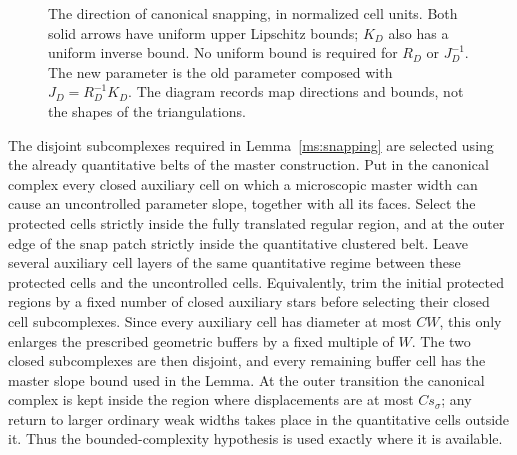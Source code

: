 \begin{figure}[htbp]
\centering
{}
\caption{The direction of canonical snapping, in normalized cell units.
Both solid arrows have uniform upper Lipschitz bounds; $K_D$ also has
a uniform inverse bound.  No uniform bound is required for
$R_D$ or $J_D^{-1}$.  The new parameter is the old parameter composed
with $J_D=R_D^{-1}K_D$.  The diagram records map directions and bounds,
not the shapes of the triangulations.}
\label{ms:fig-snapping}
\end{figure}

The disjoint subcomplexes required in
Lemma~\ref{ms:snapping} are selected using the already quantitative
belts of the master construction.  Put in the canonical complex
every closed auxiliary cell on which a microscopic master width
can cause an uncontrolled parameter slope, together with all its
faces.  Select the protected cells strictly inside the fully
translated regular region, and at the outer edge of the snap patch
strictly inside the quantitative clustered belt.  Leave several
auxiliary cell layers of the same quantitative regime between
these protected cells and the uncontrolled cells.  Equivalently,
trim the initial protected regions by a fixed number of closed
auxiliary stars before selecting their closed cell subcomplexes.
Since every auxiliary cell has diameter at most $C W$, this only
enlarges the prescribed geometric buffers by a fixed multiple of
$W$.  The two closed subcomplexes are then disjoint, and every
remaining buffer cell has the master slope bound used in the
Lemma.  At the outer transition the canonical complex is kept
inside the region where displacements are at most $C s_\sigma$;
any return to larger ordinary weak widths takes place in the
quantitative cells outside it.  Thus the bounded-complexity
hypothesis is used exactly where it is available.

